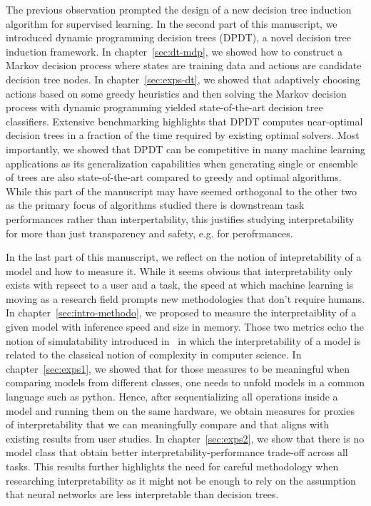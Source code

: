 The previous observation prompted the design of a new decision tree induction algorithm for supervised learning.
In the second part of this manuscript, we introduced dynamic programming decision trees (DPDT), a novel decision tree induction framework.
In chapter~\ref{sec:dt-mdp}, we showed how to construct a Markov decision process where states are training data and actions are candidate decision tree nodes.
In chapter~\ref{sec:exps-dt}, we showed that adaptively choosing actions based on some greedy heuristics and then solving the Markov decision process with dynamic programming yielded state-of-the-art decision tree classifiers.
Extensive benchmarking highlights that DPDT computes near-optimal decision trees in a fraction of the time required by existing optimal solvers.
Most importantly, we showed that DPDT can be competitive in many machine learning applications as its generalization capabilities when generating single or ensemble of trees are also state-of-the-art compared to greedy and optimal algorithms.
While this part of the manuscript may have seemed orthogonal to the other two as the primary focus of algorithms studied there is downstream task performances rather than interpertability, this justifies studying interpretability for more than just transparency and safety, e.g. for perofrmances.

In the last part of this manuscript, we reflect on the notion of intepretability of a model and how to measure it.
While it seems obvious that interpretability only exists with repsect to a user and a task, the speed at which machine learning is moving as a research field prompts new methodologies that don't require humans.
In chapter~\ref{sec:intro-methodo}, we proposed to measure the interpretaiblity of a given model with inference speed and size in memory.
Those two metrics echo the notion of simulatability introduced in~\cite{lipton} in which the interpretability of a model is related to the classical notion of complexity in computer science.
In chapter~\ref{sec:exps1}, we showed that for those measures to be meaningful when comparing models from different classes, one needs to unfold models in a common language such as python.
Hence, after sequentializing all operations inside a model and running them on the same hardware, we obtain measures for proxies of interpretability that we can meaningfully compare and that aligns with existing results from user studies.
In chapter~\ref{sec:exps2}, we show that there is no model class that obtain better interpretability-performance trade-off across all tasks.
This results further highlights the need for careful methodology when researching interpretability as it might not be enough to rely on the assumption that neural networks are less interpretable than decision trees.

